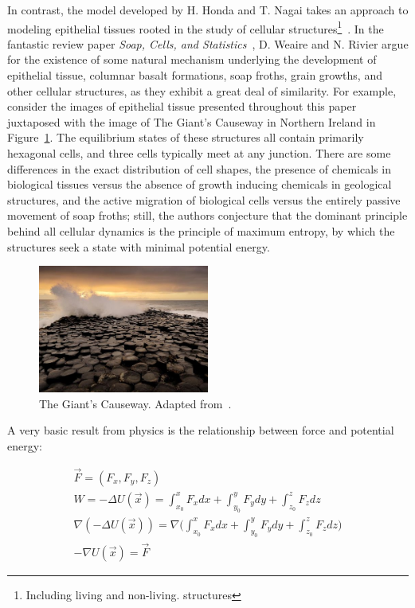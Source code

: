 In contrast, the model developed by H. Honda and T. Nagai takes an approach to modeling epithelial tissues rooted in the study of cellular structures\footnote{Including living and non-living. structures}~\cite{VertDyn}.  In the fantastic review paper \emph{Soap, Cells, and Statistics}~\cite{Soap}, D. Weaire and N. Rivier argue for the existence of some natural mechanism underlying the development of epithelial tissue, columnar basalt formations, soap froths, grain growths, and other cellular structures, as they exhibit a great deal of similarity. For example, consider the images of epithelial tissue presented throughout this paper juxtaposed with the image of The Giant's Causeway in Northern Ireland in Figure~\ref{fig:cause}. The equilibrium states of these structures all contain primarily hexagonal cells, and three cells typically meet at any junction. There are some differences in the exact distribution of cell shapes, the presence of chemicals in biological tissues versus the absence of growth inducing chemicals in geological structures, and the active migration of biological cells versus the entirely passive movement of soap froths; still, the authors conjecture that the dominant principle behind all cellular dynamics is the principle of maximum entropy, by which the structures seek a state with minimal potential energy.

\begin{figure}[h]
\centering
\includegraphics[width=0.5\textwidth]{../diagrams/resize_giant.jpg}
\caption{The Giant's Causeway. Adapted from~\cite{Giant}.}
\label{fig:cause}
\end{figure}

A very basic result from physics is the relationship between force and potential energy:

\begin{gather}
\vec{F} = (F_x, F_y, F_z)\\
W = -\Delta U(\vec{x}) = \int_{x_0}^xF_xdx+\int_{y_0}^yF_ydy+\int_{z_0}^zF_zdz\\
\nabla(-\Delta U(\vec{x})) = \nabla\Bigg(\int_{x_0}^xF_xdx+\int_{y_0}^yF_ydy+\int_{z_0}^zF_zdz\Bigg)\\
-\nabla U(\vec{x}) = \vec{F}
\end{gather}

